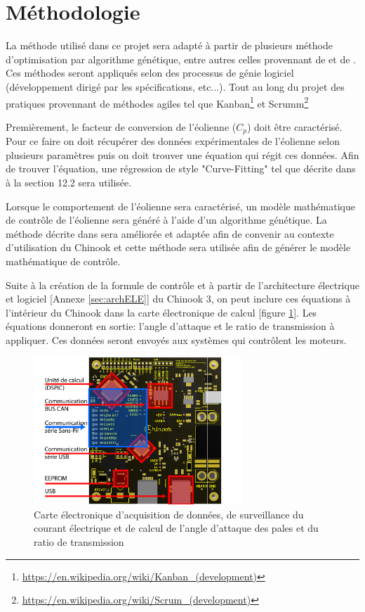 \documentclass[11pt]{article}
\begin{document}
\section{Méthodologie}

La méthode utilisé dans ce projet sera adapté à partir de plusieurs méthode d'optimisation par algorithme génétique, entre autres celles provennant de \cite{GeneticField} et de \cite{Ouissam12}. Ces méthodes seront appliqués selon des processus de génie logiciel (développement dirigé par les spécifications, etc...). Tout au long du projet des pratiques provennant de méthodes agiles tel que Kanban\footnote{\url{https://en.wikipedia.org/wiki/Kanban_(development)}} et Scrumm\footnote{\url{https://en.wikipedia.org/wiki/Scrum_(development)}} 

Premièrement, le facteur de conversion de l'éolienne ($C_p$) doit être caractérisé. Pour ce faire on doit récupérer des données expérimentales de l'éolienne selon plusieurs paramètres puis on doit trouver une équation qui régit ces données. Afin de trouver l'équation, une régression de style "Curve-Fitting" tel que décrite dans \cite{GeneticField} à la section 12.2 sera utilisée.

Lorsque le comportement de l'éolienne sera caractérisé, un modèle mathématique de contrôle de l'éolienne sera généré à l'aide d'un algorithme génétique. La méthode décrite dans \cite{Ouissam12} sera améliorée et adaptée afin de convenir au contexte d'utilisation du Chinook et cette méthode sera utilisée afin de générer le modèle mathématique de contrôle.

Suite à la création de la formule de contrôle et à partir de l'architecture électrique et logiciel [Annexe \ref{sec:archELE}] du Chinook 3, on peut inclure ces équations à l'intérieur du Chinook dans la carte électronique de calcul [figure \ref{fig:carteElec}]. Les équations donneront en sortie: l'angle d'attaque et le ratio de transmission à appliquer. Ces données seront envoyés aux systèmes qui contrôlent les moteurs.

\begin{figure}[H]
  \centering
  \includegraphics[width=0.7\textwidth]{images/3d-top-annoté.pdf}
  \caption[Carte électronique de calcul]{Carte électronique d'acquisition de données, de surveillance du courant électrique et de calcul de l'angle d'attaque des pales et du ratio de transmission}
  \label{fig:carteElec}
\end{figure}
\end{document}
